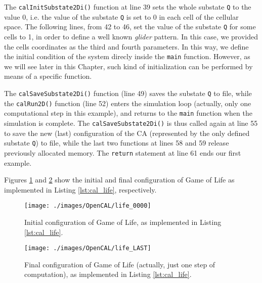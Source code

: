The \verb'calInitSubstate2Di()' function at line 39 sets the whole
substate \verb'Q' to the value 0, i.e. the value of the substate
\verb'Q' is set to 0 in each cell of the cellular space. The following
lines, from 42 to 46, set the value of the substate \verb'Q' for some
cells to 1, in order to define a well known \emph{glider} pattern. In
this case, we provided the cells coordinates as the third and fourth
parameters. In this way, we define the initial condition of the system
direcly inside the \verb'main' function. However, as we will see later
in this Chapter, such kind of initialization can be performed by means
of a specific function.

The \verb'calSaveSubstate2Di()' function (line 49) saves the substate
\verb'Q' to file, while the \verb'calRun2D()' function (line 52)
enters the simulation loop (actually, only one computational step in
this example), and returns to the \verb'main' function when the
simulation is complete. The \verb'calSaveSubstate2Di()' is thus called
again at line 55 to save the new (last) configuration of the CA
(represented by the only defined substate \verb'Q') to file, while the
last two functions at lines 58 and 59 release previously allocated memory. The
\verb'return' statement at line 61 ends our first example.

Figures \ref{fig:life_0000} and \ref{fig:life_LAST} show the initial and final configuration of Game of Life as implemented in Listing \ref{lst:cal_life}, respectively.

\begin{figure}
  \begin{center}
    \texttt{[image: ./images/OpenCAL/life\_0000]}
    \caption{Initial configuration of Game of Life, as implemented in Listing \ref{lst:cal_life}.}
    \label{fig:life_0000}
  \end{center}
\end{figure}

\begin{figure}
  \begin{center}
    \texttt{[image: ./images/OpenCAL/life\_LAST]}
    \caption{Final configuration of Game of Life (actually, just one step of computation), as implemented in Listing \ref{lst:cal_life}.}
    \label{fig:life_LAST}
  \end{center}
\end{figure}
